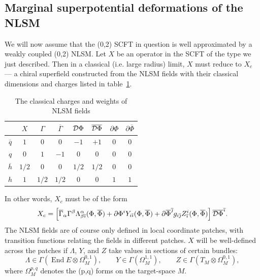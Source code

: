 \documentclass[11pt, a4paper]{article}
\def\cDb{{\overline{\cD}}}
\def\End{\operatorname{End}}
\def\p{\partial}
\def\cD{{\cal D}}
\newcommand\Gammab{\overline{\Gamma}}
\newcommand\Phib{\overline{\Phi}}
\newcommand\hb{\overline{h}}
\newcommand\ib{\overline{\imath}}
\newcommand\jb{\overline{\jmath}}
\newcommand\qb{\overline{q}}
\def\cDb{\overline{\cD}}
\begin{document}
\subsection{Marginal superpotential deformations of the NLSM}
We will now assume that the (0,2) SCFT in question is well approximated by
a weakly coupled (0,2) NLSM.    Let $X$ be an operator in the SCFT of the type we 
just described.  Then in a classical (i.e. large radius) limit, $X$ must reduce
to $X_c$ --- a chiral superfield constructed from the NLSM fields with their classical
dimensions and charges listed in table~\ref{table:charges}.   
\begin{table}
\begin{center}
\begin{tabular}{|c|c|c|c|c|c|c|c|}

~		&$X$	&$\Gamma$	&$\Gammab$	&$\cD\Phi$	&$\cDb\Phib$	&$\p\Phi$	&$\p\Phib$ \\ \hline
$\qb$	&$1$		&$0$			&$0$			&$-1$		&$+1$		&$0$			&$0$ \\ \hline
$q$		&$0$		&$1$			&$-1$		&$0$			&$0$			&$0$			&$0$ \\ \hline
$\hb$	&$1/2$	&$0$			&$0$			&$1/2$		&$1/2$		&$0$			&$0$ \\ \hline
$h$		&$1$		&$1/2$		&$1/2$		&$0$			&$0$			&$1$			&$1$ \\ \hline
\end{tabular}
\caption{The classical charges and weights of NLSM fields}
\label{table:charges}
\end{center}
\end{table}
In other words, $X_c$ must be of the form
\begin{align*}
X_c = \left[ \Gammab_{\alpha} \Gamma^\beta \Lambda^\alpha_{\beta \ib}(\Phi,\Phib) + \p \Phi^i Y_{i\ib}(\Phi,\Phib) 
+ \p\Phib^{\jb}  g_{i\jb} Z^i_{\ib}(\Phi,\Phib) \right]
\cDb \Phib^{\ib}.
\end{align*}
The NLSM fields are of course only defined in local coordinate patches, with
transition functions relating the fields in different patches. $X$ will be well-defined
across the patches if $\Lambda$, $Y$, and $Z$ take values in sections of certain bundles:
$$ \Lambda \in \Gamma( \End E \otimes \Omega^{0,1}_M), \qquad
     Y \in \Gamma(  \Omega^{1,1}_M), \qquad
     Z \in \Gamma( T_M \otimes \Omega^{0,1}_M),$$
where $\Omega_M^{p,q}$ denotes the (p,q) forms on the target-space $M$.
\end{document}
